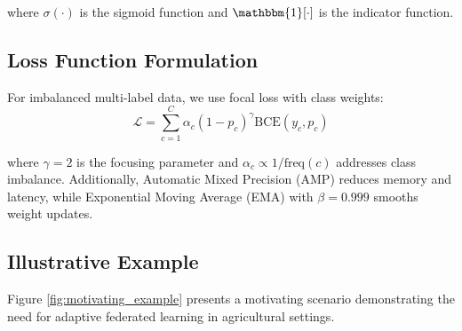\documentclass[10pt,journal,compsoc]{IEEEtran}
\begin{document}
where $\sigma(\cdot)$ is the sigmoid function and $\mathbbm{1}[\cdot]$ is the indicator function.

\subsection{Loss Function Formulation}

For imbalanced multi-label data, we use focal loss with class weights:
\begin{equation}
    \mathcal{L} = \sum_{c=1}^{C} \alpha_c (1 - p_c)^\gamma \text{BCE}(y_c, p_c)
\end{equation}

where $\gamma = 2$ is the focusing parameter and $\alpha_c \propto 1/\text{freq}(c)$ addresses class imbalance. Additionally, Automatic Mixed Precision (AMP) reduces memory and latency, while Exponential Moving Average (EMA) with $\beta = 0.999$ smooths weight updates.

\subsection{Illustrative Example}

Figure \ref{fig:motivating_example} presents a motivating scenario demonstrating the need for adaptive federated learning in agricultural settings.
\end{document}
